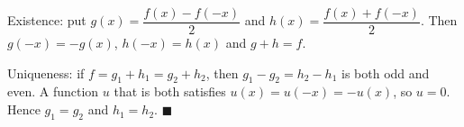 Existence: put $g(x)=\dfrac{f(x)-f(-x)}2$ and $h(x)=\dfrac{f(x)+f(-x)}2$. Then $g(-x)=-g(x)$, $h(-x)=h(x)$ and $g+h=f$.

Uniqueness: if $f=g_1+h_1=g_2+h_2$, then $g_1-g_2=h_2-h_1$ is both odd and even. A function $u$ that is both satisfies $u(x)=u(-x)=-u(x)$, so $u=0$. Hence $g_1=g_2$ and $h_1=h_2$. $\blacksquare$
